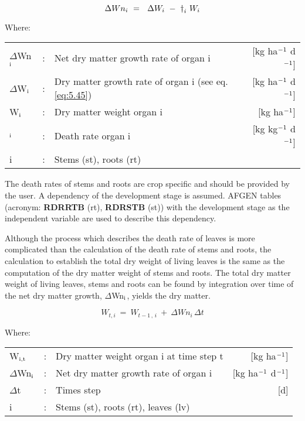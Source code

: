 \begin{equation}
\label{eq:5.48}
\Delta Wn _{i~} =~\,\,\Delta W _{i~} -~ {\rm \dag } _{i} \,\, W _{i} 
\end{equation}

Where:\\[5pt]
\begin{tabularx}{\textwidth}{llXr}
	$\Delta$Wn$_{{\rm i}}$ &:& Net dry matter growth rate of organ i   &
	[kg ha$^{{\rm -1}}$ d$^{{\rm -1}}$]\\
	$\Delta$W$_{{\rm i}}$ &:& Dry matter growth rate of organ i (see eq. \ref{eq:5.45})   &
	[kg ha$^{{\rm -1}}$ d$^{{\rm -1}}$]\\
	W$_{{\rm i}}$ &:& Dry matter weight organ i  &
	[kg ha$^{{\rm -1}}$]\\
	\dag $_{{\rm i}}$ &:& Death rate organ i   &
	[kg kg$^{{\rm -1}}$ d$^{{\rm -1}}$]\\
	i &:& Stems (st), roots (rt)\\
\end{tabularx}

The death rates of stems and roots are crop specific and should be provided by the user.
A dependency of the development stage is assumed. AFGEN tables (acronym: {\bf RDRRTB}
(rt), {\bf RDRSTB} (st)) with the development stage as the independent variable are used to
describe this dependency.

Although the process which describes the death rate of leaves is more complicated than
the calculation of the death rate of stems and roots, the calculation to establish the total
dry weight of living leaves is the same as the computation of the dry matter weight of
stems and roots. The total dry matter weight of living leaves, stems and roots can be
found by integration over time of the net dry matter growth, $\Delta$Wn$_{{\rm i}}$, yields 
the dry matter.

\begin{equation}
\label{eq:5.49}
W _{t,i} ~=~W _{t-1\, ,\, i} ~+~\Delta Wn _{i} \,\Delta t
\end{equation}

Where:\\[5pt]
\begin{tabularx}{\textwidth}{llXr}
	W$_{{\rm i,t}}$ &:& Dry matter weight organ i at time step t   &
	[kg ha$^{{\rm -1}}$]\\
	$\Delta$Wn$_{{\rm i}}$ &:& Net dry matter growth rate of organ i   &
	[kg ha$^{{\rm -1}}$ d$^{{\rm -1}}$]\\
	$\Delta$t &:& Times step   &
	[d]\\
	i &:& Stems (st), roots (rt), leaves (lv)\\
\end{tabularx}


